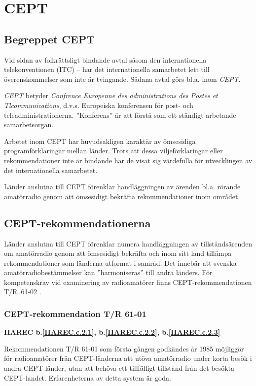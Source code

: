 
\section{CEPT}

\subsection{Begreppet CEPT}

Vid sidan av folkrättsligt bindande avtal såsom den internationella
telekonventionen (ITC) -- har det internationella samarbetet lett till
överenskommelser som inte är tvingande. Sådana avtal görs bl.a. inom
\emph{CEPT}.

\emph{CEPT} betyder \emph{Confrence Europenne des administrations des
	Postes et Tlcommunications}, d.v.s. Europeiska konferensen
för post- och teleadministrationerna. ''Konferens'' är att förstå som
ett ständigt arbetande samarbetsorgan.

Arbetet inom CEPT har huvudsakligen karaktär av ömsesidiga programförklaringar
mellan länder.
Trots att dessa viljeförklaringar eller rekommendationer inte är bindande har de
visat sig värdefulla för utvecklingen av det internationella samarbetet.

Länder anslutna till CEPT förenklar handläggningen av ärenden bl.a. rörande
amatörradio genom att ömsesidigt bekräfta rekommendationer inom området.

\subsection{CEPT-rekommendationerna}

Länder anslutna till CEPT förenklar numera handläggningen av
tillståndsärenden om amatörradio genom att ömsesidigt bekräfta och
inom sitt land tillämpa rekommendationer som länderna utformat i
samråd.
Det innebär att svenska amatörradiobestämmelser kan ''harmoniseras'' till andra
länders.
För kompetenskrav vid examinering av radioamatörer finns CEPT-rekommendationen
T/R~61-02 \cite{TR6102}.

\subsubsection{CEPT-rekommendation T/R 61-01}
\textbf{
HAREC b.\ref{HAREC.c.2.1}\label{myHAREC.c.2.1},
 b.\ref{HAREC.c.2.2}\label{myHAREC.c.2.2},
 b.\ref{HAREC.c.2.3}\label{myHAREC.c.2.3}
}

Rekommendationen T/R 61-01 \cite{TR6101} som första gången godkändes år 1985
möjliggör för radioamatörer från CEPT-länderna att utöva amatörradio under korta
besök i andra CEPT-länder, utan att behöva ett tillfälligt tillstånd från det
besökta CEPT-landet.
Erfarenheterna av detta system är goda.

